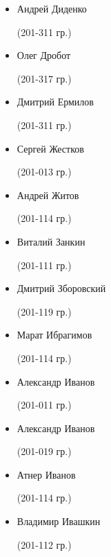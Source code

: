 \begin{multicols}{2}
\begin{small}
\begin{itemize}[leftmargin=0.5em]
	\item[] Андрей Диденко\begin{tiny} (201-311 гр.)\end{tiny} %
	\item[] Олег Дробот\begin{tiny} (201-317 гр.)\end{tiny} %

	\item[] Дмитрий Ермилов\begin{tiny} (201-311 гр.)\end{tiny} %

	\item[] Сергей Жестков\begin{tiny} (201-013 гр.)\end{tiny}
	\item[] Андрей Житов\begin{tiny} (201-114 гр.)\end{tiny} %

	\item[] Виталий Занкин\begin{tiny} (201-111 гр.)\end{tiny} %
	\item[] Дмитрий Зборовский\begin{tiny} (201-119 гр.)\end{tiny}

	\item[] Марат Ибрагимов\begin{tiny} (201-114 гр.)\end{tiny}
	\item[] Александр Иванов\begin{tiny} (201-011 гр.)\end{tiny}
	\item[] Александр Иванов\begin{tiny} (201-019 гр.)\end{tiny}
	\item[] Атнер Иванов\begin{tiny} (201-114 гр.)\end{tiny}
	\item[] Владимир Ивашкин\begin{tiny} (201-112 гр.)\end{tiny}


\end{itemize}
\end{small}
\end{multicols}
